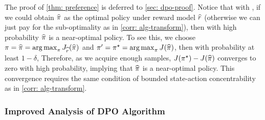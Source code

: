\documentclass{article}
\newcommand{\arxiv}[1]{\iftoggle{icml}{}{#1}}
\newcommand{\icml}[1]{\iftoggle{icml}{#1}{}}
\begin{document}
The proof of \cref{thm: preference} is deferred to \cref{sec: dpo-proof}.
Notice that with , if we could obtain $\widehat{\pi}$ as the optimal policy under reward model $\widehat{r}$ (otherwise we can just pay for the sub-optimality as in \cref{corr: alg-transform}), then with high probability $\widehat{\pi}$ is a near-optimal policy. To see this, we choose $\pi = \widehat{\pi} = \mathop{\arg\max}_{\pi} J_{\widehat{r}}(\widehat{\pi})$ and $\pi' = \pi^\star = \mathop{\arg\max}_{\pi} J(\widehat{\pi})$, then with probability at least $1 - \delta$,
\arxiv{
\begin{align*}
    J(\pi^\star) - J(\pihat) & \le J(\pi^\star) - J(\pihat) - J_{\hr}(\pi^\star) + J_{\hr}(\pihat) = \EE_{\tau\sim \pihat, \tau'\sim \pi^\star}[r^\star(\tau') - r^\star(\tau) - \hr(\tau') + \hr(\tau)]\\
    & \le \EE_{\tau\sim \pihat, \tau'\sim \pi^\star}[|r^\star(\tau') - r^\star(\tau) - \hr(\tau') + \hr(\tau)|]\\
    & \lesssim H^{3/2}\rmax e^{2\rmax}\cdot \sqrt{\frac{(\Cs(\pihat, \piref)\vee \Cs(\pi^\star, \piref))\log(|\Pi|/\delta)}{|\calD|}},
\end{align*}
}
\icml{
\begin{align*}
    &~ J(\pi^\star) - J(\pihat)\\
    \le &~ J(\pi^\star) - J(\pihat) - J_{\hr}(\pi^\star) + J_{\hr}(\pihat)\\
    = &~ \EE_{\tau\sim \pihat, \tau'\sim \pi^\star}[r^\star(\tau') - r^\star(\tau) - \hr(\tau') + \hr(\tau)]\\
    \le &~ \EE_{\tau\sim \pihat, \tau'\sim \pi^\star}[|r^\star(\tau') - r^\star(\tau) - \hr(\tau') + \hr(\tau)|]\\
    \lesssim &~ H^{3/2}\rmax e^{2\rmax} \icml{\\ & \quad} \cdot \sqrt{\frac{(\Cs(\pihat, \piref)\vee \Cs(\pi^\star, \piref))\log(|\Pi|/\delta)}{|\calD|}}
    \\
    \leq &~ H^{3/2}\rmax e^{2\rmax} \cdot \sqrt{\frac{\Cs(\Pi, \pioff)\log(|\Pi|/\delta)}{|\calD|}},
\end{align*}
}
Therefore, as we acquire enough samples, $J(\pi^\star) - J(\widehat{\pi})$ converges to zero with high probability, implying that $\widehat{\pi}$ is a near-optimal policy. This convergence requires the same condition of bounded state-action concentrability as in \cref{corr: alg-transform}.


\subsubsection{Improved Analysis of DPO Algorithm}
\end{document}
